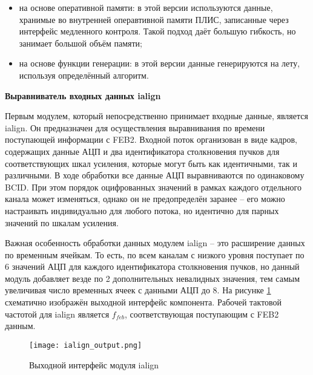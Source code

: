 \begin{itemize}
    \item на основе оперативной памяти: в этой версии используются данные, хранимые во внутренней операвтивной памяти ПЛИС, записанные через интерфейс медленного контроля. Такой подход даёт большую гибкость, но занимает большой объём памяти;
    \item на основе функции генерации: в этой версии данные генерируются на лету, используя определённый алгоритм.
\end{itemize}\par
\textbf{Выравниватель входных данных ialign}\par
Первым модулем, который непосредственно принимает входные данные, является ialign. Он предназначен для осуществления выравнивания по времени поступающей информации с FEB2. Входной поток организован в виде кадров, содержащих данные АЦП и два идентификатора столкновения пучков для соответствующих шкал усиления, которые могут быть как идентичными, так и различными. В ходе обработки все данные АЦП выравниваются по одинаковому BCID. При этом порядок оцифрованных значений в рамках каждого отдельного канала может изменяться, однако он не предопределён заранее -- его можно настраивать индивидуально для любого потока, но идентично для парных значений по шкалам усиления.\par
Важная особенность обработки данных модулем ialign -- это расширение данных по временным ячейкам. То есть, по всем каналам с низкого уровня поступает по 6 значений АЦП для каждого идентификатора столкновения пучков, но данный модуль добавляет везде по 2 дополнительных невалидных значения, тем самым увеличивая число временных ячеек с данными АЦП до 8. На рисунке \ref{fig:ialign_output} схематично изображён выходной интерфейс компонента. Рабочей тактовой частотой для ialign является $f_{feb}$, соответствующая поступающим с FEB2 данным.

\begin{figure}[ht]
    \centering
    \texttt{[image: ialign\_output.png]}
    \caption{Выходной интерфейс модуля ialign}
    \label{fig:ialign_output}
\end{figure}\par

